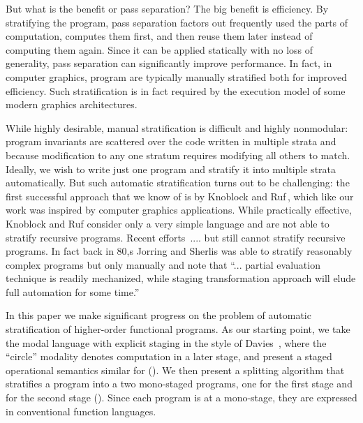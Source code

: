 

But what is the benefit or pass separation? The big benefit is
efficiency. By stratifying the program, pass separation factors out
frequently used the parts of computation, computes them first, and
then reuse them later instead of computing them again.  Since it can
be applied statically with no loss of generality, pass separation can
significantly improve performance.  In fact, in computer graphics,
program are typically manually stratified both for improved
efficiency. Such stratification is in fact required by the execution
model of some modern graphics architectures.  

While highly desirable, manual stratification is difficult and highly
nonmodular: program invariants are scattered over the code written in
multiple strata and because modification to any one stratum requires
modifying all others to match.  Ideally, we wish to write just one
program and stratify it into multiple strata automatically.  But such
automatic stratification turns out to be challenging: the first
successful approach that we know of is by Knoblock and
Ruf\,\cite{knoblock96}, which like our work was inspired by computer
graphics applications.  While practically effective, Knoblock and Ruf
consider only a very simple language and are not able to stratify
recursive programs.  Recent
efforts\,\cite{Proudfoot:2001,Foley:2011,He:2014} ....  but still
cannot stratify recursive programs.
%
In fact back in 80,s Jorring and Sherlis was able to stratify
reasonably complex programs but only manually and note that
``... partial evaluation technique is readily mechanized, while
staging transformation approach will elude full automation for some
time.''

In this paper we make significant progress on the problem of automatic
stratification of higher-order functional programs.  As our starting
point, we take the modal language \langname with explicit staging in
the style of Davies~\cite{Davies}, where the ``circle'' modality
denotes computation in a later stage, and present a staged operational
semantics similar for \langname ().  We then present
a splitting algorithm that stratifies a \langname program into a two
mono-staged programs, one for the first stage and for the second stage
().  Since each program is at a mono-stage, they are
expressed in conventional function languages.

